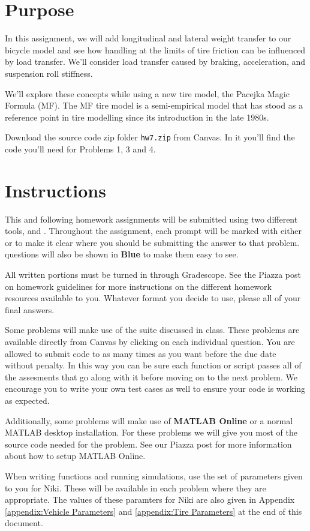 \hspace{0.5cm}

\section*{Purpose}

In this assignment, we will add longitudinal and lateral weight transfer to our bicycle model and see how handling at
the limits of tire friction can be influenced by load transfer.  
We'll consider load transfer caused by braking, acceleration, and suspension roll stiffness.  

We'll explore these concepts while using a new tire model, the Pacejka Magic Formula (MF). The MF tire model is a semi-empirical model that has stood as a reference point in tire modelling since its introduction in the late 1980s. 

Download the source code zip folder \verb!hw7.zip! from Canvas. In it you'll find the code you'll need for
Problems 1, 3 and 4.

\section*{Instructions}

This and following homework assignments will be submitted using two different tools, \GSno{} and \GRno{}.
Throughout the assignment, each prompt will be marked with either \GS{} or \GR{} to make it clear
where you should be submitting the answer to that problem. \GRno{} questions will also be shown in
\textbf{\color{blue}Blue} to make them easy to see.

All written portions must be turned in through Gradescope. See the Piazza post on homework guidelines for more
instructions on the different homework resources available to you. Whatever format you decide to use, please  all of your final answers.

Some problems will make use of the \GRno{} suite discussed in class. These problems are available directly from Canvas
by clicking on each individual question.
You are allowed to submit code to \GRno{} as many times as you want before the due date without penalty. In this
way you can be sure each function or script passes all of the assesments that go along with it before moving on to the
next problem. We encourage you to write
your own test cases as well to ensure your code is working as expected. 

Additionally, some problems will make use of \textbf{MATLAB Online} or a normal MATLAB desktop installation. For these
problems we will give you most of the source code needed for the problem. See our Piazza post for more information 
about how to setup MATLAB Online.

When writing functions and running simulations, use the set of parameters given to you for Niki. These will be available
in each \GRno{} problem where they are appropriate. 
The values of these paramters for Niki are also given in Appendix \ref{appendix:Vehicle Parameters} and
\ref{appendix:Tire Parameters} at the end of this document.


\newpage
